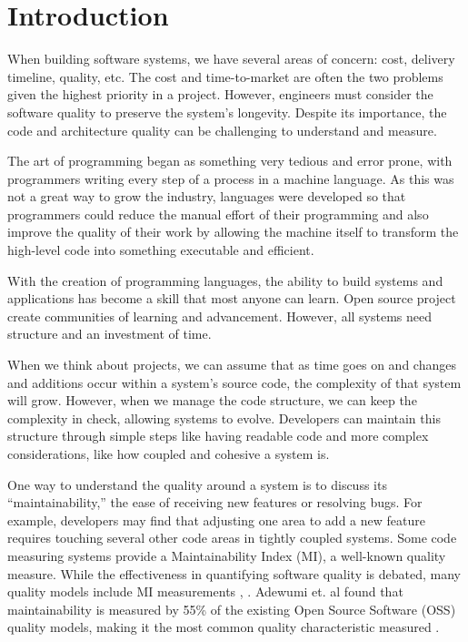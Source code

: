 \chapter{Introduction} \label{sectionIntroduction}

When building software systems, we have several areas of concern: cost, delivery timeline, quality, etc. The cost and time-to-market are often the two problems given the highest priority in a project. However, engineers must consider the software quality to preserve the system's longevity. Despite its importance, the code and architecture quality can be challenging to understand and measure.

The art of programming began as something very tedious and error prone, with programmers writing every step of a process in a machine language. As this was not a great way to grow the industry, languages were developed so that programmers could reduce the manual effort of their programming and also improve the quality of their work by allowing the machine itself to transform the high-level code into something executable and efficient. \cite{lehman:1980}

With the creation of programming languages, the ability to build systems and applications has become a skill that most anyone can learn. Open source project create communities of learning and advancement. However, all systems need structure and an investment of time. 

When we think about projects, we can assume that as time goes on and changes and additions occur within a system's source code, the complexity of that system will grow. However, when we manage the code structure, we can keep the complexity in check, allowing systems to evolve. Developers can maintain this structure through simple steps like having readable code and more complex considerations, like how coupled and cohesive a system is.

One way to understand the quality around a system is to discuss its ``maintainability,'' the ease of receiving new features or resolving bugs. For example, developers may find that adjusting one area to add a new feature requires touching several other code areas in tightly coupled systems. Some code measuring systems provide a Maintainability Index (MI), a well-known quality measure. While the effectiveness in quantifying software quality is debated, many quality models include MI measurements \cite{vandeursen:2014}, \cite{adewumi:2016}. Adewumi et. al found that maintainability is measured by 55\% of the existing Open Source Software (OSS) quality models, making it the most common quality characteristic measured \cite{adewumi:2016}.

